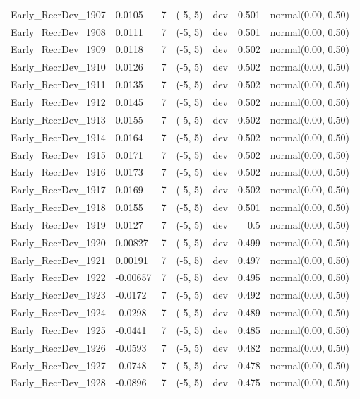 \documentclass[
]{scrartcl}
\begin{document}
\begin{landscape}
\begin{longtable}{llrllrl}
Early\_RecrDev\_1907 & 0.0105 & 7 & (-5, 5) & dev & 0.501 & normal(0.00, 0.50) \\ 
Early\_RecrDev\_1908 & 0.0111 & 7 & (-5, 5) & dev & 0.501 & normal(0.00, 0.50) \\ 
Early\_RecrDev\_1909 & 0.0118 & 7 & (-5, 5) & dev & 0.502 & normal(0.00, 0.50) \\ 
Early\_RecrDev\_1910 & 0.0126 & 7 & (-5, 5) & dev & 0.502 & normal(0.00, 0.50) \\ 
Early\_RecrDev\_1911 & 0.0135 & 7 & (-5, 5) & dev & 0.502 & normal(0.00, 0.50) \\ 
Early\_RecrDev\_1912 & 0.0145 & 7 & (-5, 5) & dev & 0.502 & normal(0.00, 0.50) \\ 
Early\_RecrDev\_1913 & 0.0155 & 7 & (-5, 5) & dev & 0.502 & normal(0.00, 0.50) \\ 
Early\_RecrDev\_1914 & 0.0164 & 7 & (-5, 5) & dev & 0.502 & normal(0.00, 0.50) \\ 
Early\_RecrDev\_1915 & 0.0171 & 7 & (-5, 5) & dev & 0.502 & normal(0.00, 0.50) \\ 
Early\_RecrDev\_1916 & 0.0173 & 7 & (-5, 5) & dev & 0.502 & normal(0.00, 0.50) \\ 
Early\_RecrDev\_1917 & 0.0169 & 7 & (-5, 5) & dev & 0.502 & normal(0.00, 0.50) \\ 
Early\_RecrDev\_1918 & 0.0155 & 7 & (-5, 5) & dev & 0.501 & normal(0.00, 0.50) \\ 
Early\_RecrDev\_1919 & 0.0127 & 7 & (-5, 5) & dev & 0.5 & normal(0.00, 0.50) \\ 
Early\_RecrDev\_1920 & 0.00827 & 7 & (-5, 5) & dev & 0.499 & normal(0.00, 0.50) \\ 
Early\_RecrDev\_1921 & 0.00191 & 7 & (-5, 5) & dev & 0.497 & normal(0.00, 0.50) \\ 
Early\_RecrDev\_1922 & -0.00657 & 7 & (-5, 5) & dev & 0.495 & normal(0.00, 0.50) \\ 
Early\_RecrDev\_1923 & -0.0172 & 7 & (-5, 5) & dev & 0.492 & normal(0.00, 0.50) \\ 
Early\_RecrDev\_1924 & -0.0298 & 7 & (-5, 5) & dev & 0.489 & normal(0.00, 0.50) \\ 
Early\_RecrDev\_1925 & -0.0441 & 7 & (-5, 5) & dev & 0.485 & normal(0.00, 0.50) \\ 
Early\_RecrDev\_1926 & -0.0593 & 7 & (-5, 5) & dev & 0.482 & normal(0.00, 0.50) \\ 
Early\_RecrDev\_1927 & -0.0748 & 7 & (-5, 5) & dev & 0.478 & normal(0.00, 0.50) \\ 
Early\_RecrDev\_1928 & -0.0896 & 7 & (-5, 5) & dev & 0.475 & normal(0.00, 0.50) \\ 

\end{longtable}
\end{landscape}
\end{document}
